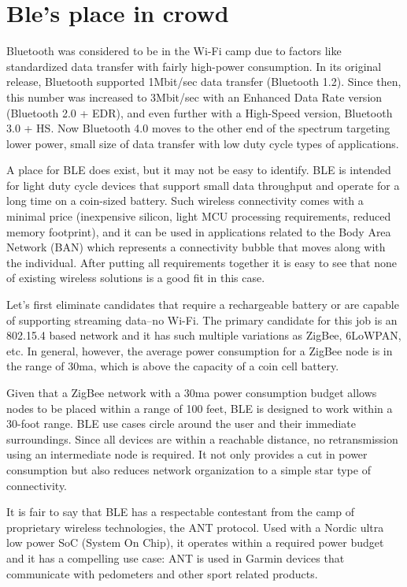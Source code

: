 \documentclass[11pt,a4paper]{article}
\begin{document}
	\newpage
	\section{Ble's place in crowd}
	{
	Bluetooth was considered to be in the Wi-Fi camp due to factors like standardized data transfer with fairly high-power consumption. In its original release, Bluetooth supported 1Mbit/sec data transfer (Bluetooth 1.2). Since then, this number was increased to 3Mbit/sec with an Enhanced Data Rate version (Bluetooth 2.0 + EDR), and even further with a High-Speed version, Bluetooth 3.0 + HS. Now Bluetooth 4.0 moves to the other end of the spectrum targeting lower power, small size of data transfer with low duty cycle types of applications.

A place for BLE does exist, but it may not be easy to identify. BLE is intended for light duty cycle devices that support small data throughput and operate for a long time on a coin-sized battery. Such wireless connectivity comes with a minimal price (inexpensive silicon, light MCU processing requirements, reduced memory footprint), and it can be used in applications related to the Body Area Network (BAN) which represents a connectivity bubble that moves along with the individual.  After putting all requirements together it is easy to see that none of existing wireless solutions is a good fit in this case.

Let's first eliminate candidates that require a rechargeable battery or are capable of supporting streaming data--no Wi-Fi. The primary candidate for this job is an 802.15.4 based network and it has such multiple variations as ZigBee, 6LoWPAN, etc. In general, however, the average power consumption for a ZigBee node is in the range of 30ma, which is above the capacity of a coin cell battery.

 

Given that a ZigBee network with a 30ma power consumption budget allows nodes to be placed within a range of 100 feet, BLE is designed to work within a 30-foot range. BLE use cases circle around the user and their immediate surroundings. Since all devices are within a reachable distance, no retransmission using an intermediate node is required. It not only provides a cut in power consumption but also reduces network organization to a simple star type of connectivity.

 

It is fair to say that BLE has a respectable contestant from the camp of proprietary wireless technologies, the ANT protocol. Used with a Nordic ultra low power SoC (System On Chip), it operates within a required power budget and it has a compelling use case: ANT is used in Garmin devices that communicate with pedometers and other sport related products.

}
\end{document}
